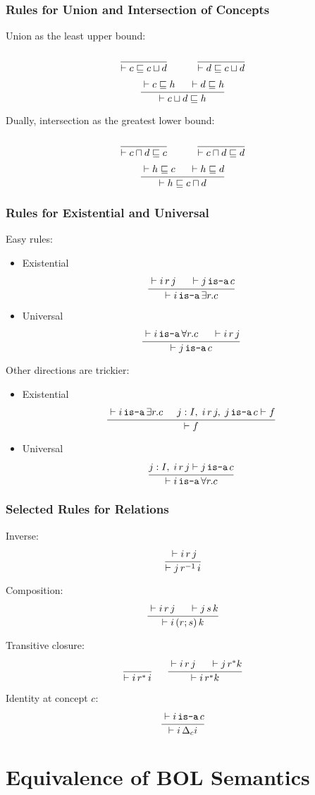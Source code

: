 \begin{frame}\frametitle{Rules for Union and Intersection of Concepts}
Union as the least upper bound:
\[\rul{}{\vdash c\sqsubseteq c\sqcup d} \tb\tb \rul{}{\vdash d\sqsubseteq c\sqcup d }\]
\[\cfrac{\vdash c\sqsubseteq h \hspace*{.5cm} \vdash d\sqsubseteq h}{\vdash c\sqcup d \sqsubseteq h}\,\]
\medskip

Dually, intersection as the greatest lower bound:
\[\rul{}{\vdash c\sqcap d\sqsubseteq c} \tb\tb \rul{}{\vdash c\sqcap d\sqsubseteq d}\]
\[\cfrac{\vdash h\sqsubseteq c \hspace*{.5cm} \vdash h\sqsubseteq d}{\vdash h \sqsubseteq c\sqcap d}\,\]
\end{frame}

\begin{frame}\frametitle{Rules for Existential and Universal}
Easy rules:
\begin{itemize}
\item Existential
\[\cfrac{\vdash i\,r\,j \hspace*{.5cm} \vdash j\mathop{\texttt{is-a}} c}{\vdash i \mathop{\texttt{is-a}} \exists r.c }\,\]
\item Universal
\[\cfrac{\vdash i \mathop{\texttt{is-a}} \forall r.c \hspace*{.5cm} \vdash i\,r\,j}{\vdash j\mathop{\texttt{is-a}} c}\,\]
\end{itemize}

Other directions are trickier:

\begin{itemize}
\item Existential
\[\cfrac{\vdash i \mathop{\texttt{is-a}} \exists r.c \hspace*{.5cm} j:I,\;i\,r\,j,\;j\mathop{\texttt{is-a}} c\vdash f}{\vdash f}\,\]
\item Universal
\[\cfrac{j:I,\; i\,r\,j\vdash j\mathop{\texttt{is-a}} c}{\vdash i\mathop{\texttt{is-a}}\forall r.c}\,\]
\end{itemize}
\end{frame}

\begin{frame}\frametitle{Selected Rules for Relations}
Inverse:
\[\cfrac{\vdash i \,r\,j}{\vdash j\,r^{-1}\,i}\,\]

Composition:
\[\cfrac{\vdash i \,r\,j \hspace*{.5cm} \vdash j\,s\,k}{\vdash i\,(r;s)\,k}\,\]

Transitive closure:
\[\cfrac{}{\vdash i \,r^*\,i}\, \hspace*{.5cm} \cfrac{\vdash i\,r\,j \hspace*{.5cm} \vdash j\,r^* k}{\vdash i\,r^* k}\,\]

Identity at concept $c$:
\[\cfrac{\vdash i \mathop{\texttt{is-a}} c}{\vdash i\,\Delta_c i}\,\]
\end{frame}

\section{Equivalence of BOL Semantics}


